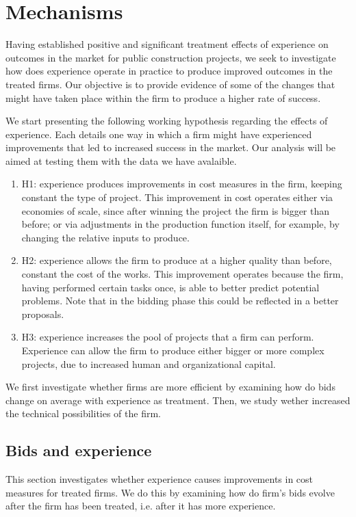 \chapter{Mechanisms}
Having established positive and significant treatment effects of  experience on outcomes in the market for public construction projects, we seek to investigate how does experience operate in practice to produce improved outcomes in the treated firms. Our objective is to provide evidence of some of the changes that might have taken place within the firm to produce a higher rate of success.

We start presenting the following working hypothesis regarding the effects of experience. Each details one way in which a firm might have experienced improvements that led to increased success in the market. Our analysis will be aimed at testing them with the data we have avalaible.

\begin{enumerate}
  \item{H1}: experience produces improvements in cost measures in the firm, keeping constant the type of project. This improvement in cost operates either via economies of scale, since after winning the project the firm is bigger than before; or via adjustments in the production function itself, for example, by changing the relative inputs to produce.
  \item{H2}: experience allows the firm to produce at a higher quality than before, constant the cost of the works. This improvement operates because the firm, having performed certain tasks once, is able to better predict potential problems. Note that in the bidding phase this could be reflected in a better proposals.
  \item{H3}: experience increases the pool of projects that a firm can perform. Experience can allow the firm to produce either bigger or more complex projects, due to increased human and organizational capital.
\end{enumerate}

We first investigate whether firms are more efficient by examining how do bids change on average with experience as treatment. Then, we study wether increased the technical possibilities of the firm.

\section{Bids and experience}
This section investigates whether experience causes improvements in cost measures for treated firms. We do this by examining how do firm's bids evolve after the firm has been treated, i.e. after it has more experience.

